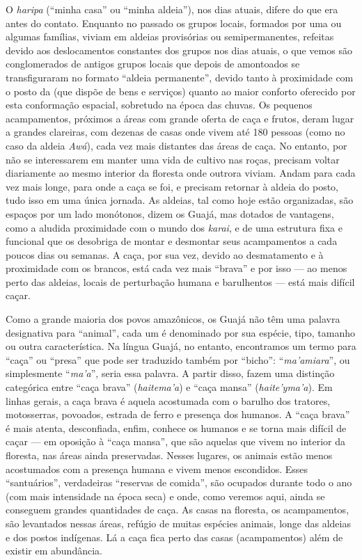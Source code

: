 O \emph{haripa} (``minha casa'' ou ``minha aldeia''), nos dias atuais,
difere do que era antes do contato. Enquanto no passado os grupos
locais, formados por uma ou algumas famílias, viviam em aldeias
provisórias ou semipermanentes, refeitas devido aos deslocamentos
constantes dos grupos nos dias atuais, o que vemos são conglomerados de
antigos grupos locais que depois de amontoados se transfiguraram no
formato ``aldeia permanente'', devido tanto à proximidade com o posto da
 (que dispõe de bens e serviços) quanto ao maior conforto oferecido
por esta conformação espacial, sobretudo na época das chuvas. Os
pequenos acampamentos, próximos a áreas com grande oferta de caça e
frutos, deram lugar a grandes clareiras, com dezenas de casas onde vivem
até 180 pessoas (como no caso da aldeia \emph{Awá}), cada vez mais
distantes das áreas de caça. No entanto, por não se interessarem em
manter uma vida de cultivo nas roças, precisam voltar diariamente ao
mesmo interior da floresta onde outrora viviam. Andam para cada vez mais
longe, para onde a caça se foi, e precisam retornar à aldeia do posto,
tudo isso em uma única jornada. As aldeias, tal como hoje estão
organizadas, são espaços por um lado monótonos, dizem os Guajá, mas
dotados de vantagens, como a aludida proximidade com o mundo dos
\emph{karai}, e de uma estrutura fixa e funcional que os desobriga de
montar e desmontar seus acampamentos a cada poucos dias ou semanas. A
caça, por sua vez, devido ao desmatamento e à proximidade com os
brancos, está cada vez mais ``brava'' e por isso --- ao menos perto das
aldeias, locais de perturbação humana e barulhentos --- está mais difícil
caçar.

Como a grande maioria dos povos amazônicos, os Guajá não têm uma palavra
designativa para ``animal'', cada um é denominado por sua espécie, tipo,
tamanho ou outra característica. Na língua Guajá, no entanto,
encontramos um termo para ``caça'' ou ``presa'' que pode ser traduzido
também por ``bicho'': ``\emph{ma'amiara}'', ou simplesmente
``\emph{ma'a}'', seria essa palavra. A partir disso, fazem uma distinção
categórica entre ``caça brava'' (\emph{haitema'a}) e ``caça mansa''
(\emph{haite'yma'a}). Em linhas gerais, a caça brava é aquela acostumada
com o barulho dos tratores, motosserras, povoados, estrada de ferro e
presença dos humanos. A ``caça brava'' é mais atenta, desconfiada, enfim,
conhece os humanos e se torna mais difícil de caçar --- em oposição à
``caça mansa'', que são aquelas que vivem no interior da floresta, nas
áreas ainda preservadas. Nesses lugares, os animais estão menos
acostumados com a presença humana e vivem menos escondidos. Esses
``santuários'', verdadeiras ``reservas de comida'', são ocupados durante
todo o ano (com mais intensidade na época seca) e onde, como veremos
aqui, ainda se conseguem grandes quantidades de caça. As casas na
floresta, os acampamentos, são levantados nessas áreas, refúgio de
muitas espécies animais, longe das aldeias e dos postos indígenas. Lá a
caça fica perto das casas (acampamentos) além de existir em abundância.

